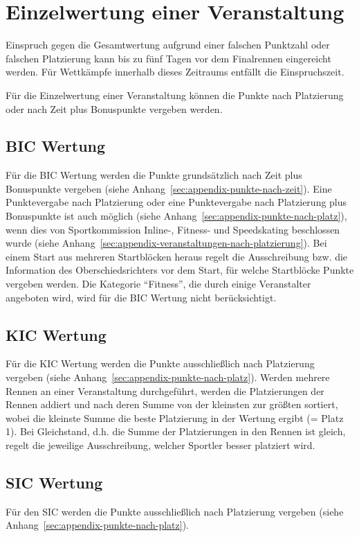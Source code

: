 \section{Einzelwertung einer Veranstaltung}
Einspruch gegen die Gesamtwertung aufgrund einer falschen Punktzahl oder falschen Platzierung kann bis zu fünf Tagen vor dem Finalrennen eingereicht werden. Für Wettkämpfe innerhalb dieses Zeitraums entfällt die Einspruchszeit.

Für die Einzelwertung einer Veranstaltung können die Punkte nach Platzierung oder nach Zeit plus Bonuspunkte vergeben werden.

\subsection{BIC Wertung}
Für die BIC Wertung werden die Punkte grundsätzlich nach Zeit plus Bonuspunkte vergeben (siehe Anhang~\ref{sec:appendix-punkte-nach-zeit}). Eine Punktevergabe nach Platzierung oder eine Punktevergabe nach Platzierung plus Bonuspunkte ist auch möglich (siehe Anhang~\ref{sec:appendix-punkte-nach-platz}), wenn dies von Sportkommission Inline-, Fitness- und Speedskating beschlossen wurde (siehe Anhang~\ref{sec:appendix-veranstaltungen-nach-platzierung}). Bei einem Start aus mehreren Startblöcken heraus regelt die Ausschreibung bzw. die Information des Oberschiedsrichters vor dem Start, für welche Startblöcke Punkte vergeben werden. Die Kategorie “Fitness”, die durch einige Veranstalter angeboten wird, wird für die BIC Wertung nicht berücksichtigt.

\subsection{KIC Wertung}
Für die KIC Wertung werden die Punkte ausschließlich nach Platzierung vergeben (siehe Anhang~\ref{sec:appendix-punkte-nach-platz}). Werden mehrere Rennen an einer Veranstaltung durchgeführt, werden die Platzierungen der Rennen addiert und nach deren Summe von der kleinsten zur größten sortiert, wobei die kleinste Summe die beste Platzierung in der Wertung ergibt (= Platz 1). Bei Gleichstand, d.h. die Summe der Platzierungen in den Rennen ist gleich, regelt die jeweilige Ausschreibung, welcher Sportler besser platziert wird.

\subsection{SIC Wertung}
Für den SIC werden die Punkte ausschließlich nach Platzierung vergeben (siehe Anhang~\ref{sec:appendix-punkte-nach-platz}).